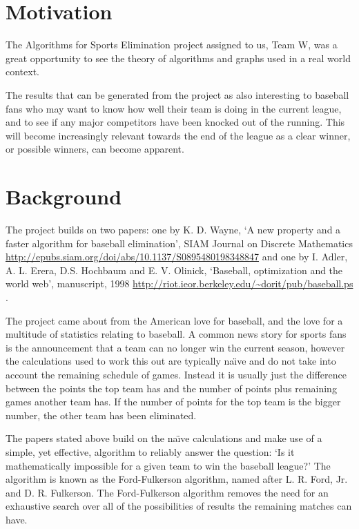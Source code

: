 \section{Motivation}

The Algorithms for Sports Elimination project assigned to us, Team W, was a
great opportunity to see the theory of algorithms and graphs used in a real
world context.

The results that can be generated from the project as also interesting to
baseball fans who may want to know how well their team is doing in the current
league, and to see if any major competitors have been knocked out of the
running. This will become increasingly relevant towards the end of the league
as a clear winner, or possible winners, can become apparent.

\section{Background}

The project builds on two papers: one by K. D. Wayne, `A new property and a
faster algorithm for baseball elimination', SIAM Journal on Discrete
Mathematics \url{http://epubs.siam.org/doi/abs/10.1137/S0895480198348847}
\cite{Wayne} and one by I. Adler, A. L. Erera, D.S. Hochbaum and E. V. Olinick,
`Baseball, optimization and the world web', manuscript, 1998
\url{http://riot.ieor.berkeley.edu/~dorit/pub/baseball.ps} \cite{Adler}.

The project came about from the American love for baseball, and the love for
a multitude of statistics relating to baseball. A common news story for sports
fans is the announcement that a team can no longer win the current season,
however the calculations used to work this out are typically na\"{\i}ve and
do not take into account the remaining schedule of games. Instead it is
usually just the difference between the points the top team has and the number
of points plus remaining games another team has. If the number of points
for the top team is the bigger number, the other team has been eliminated.

The papers stated above build on the na\"{\i}ve calculations and make use of a
simple, yet effective, algorithm to reliably answer the question:
`Is it mathematically impossible for a given team to win the baseball league?'
The algorithm is known as the Ford-Fulkerson algorithm, named after L. R. Ford,
Jr. and D. R. Fulkerson. The Ford-Fulkerson algorithm removes the need for an
exhaustive search over all of the possibilities of results the remaining
matches can have.

